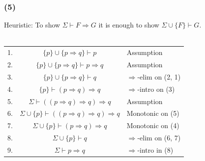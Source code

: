\documentclass{article}
\begin{document}
\subsubsection*{(5)}
Heuristic: To show $\Sigma\vdash F\Rightarrow G$ it is enough to show $\Sigma\cup\{F\}\vdash G$.\\
\\
\begin{tabular}{r c l}
    1. & $\{p\}\cup \{p\Rightarrow q\}\vdash p$ & Assumption\\
    2. & $\{p\}\cup \{p\Rightarrow q\}\vdash p\Rightarrow q$ & Assumption\\
    3. & $\{p\}\cup \{p\Rightarrow q\}\vdash q$ & $\Rightarrow$-elim on (2, 1)\\
    4. & $\{p\}\vdash (p\Rightarrow q)\Rightarrow q$ & $\Rightarrow$-intro on (3)\\
    5. & $\Sigma\vdash ((p\Rightarrow q)\Rightarrow q)\Rightarrow q$ & Assumption\\
    6. & $\Sigma\cup\{p\}\vdash ((p\Rightarrow q)\Rightarrow q)\Rightarrow q$ & Monotonic on (5)\\
    7. & $\Sigma\cup\{p\}\vdash (p\Rightarrow q)\Rightarrow q$ & Monotonic on (4)\\
    8. & $\Sigma\cup\{p\}\vdash q$ & $\Rightarrow$-elim on (6, 7)\\
    9. & $\Sigma\vdash p\Rightarrow q$ & $\Rightarrow$-intro in (8)\\
\end{tabular}
\end{document}
